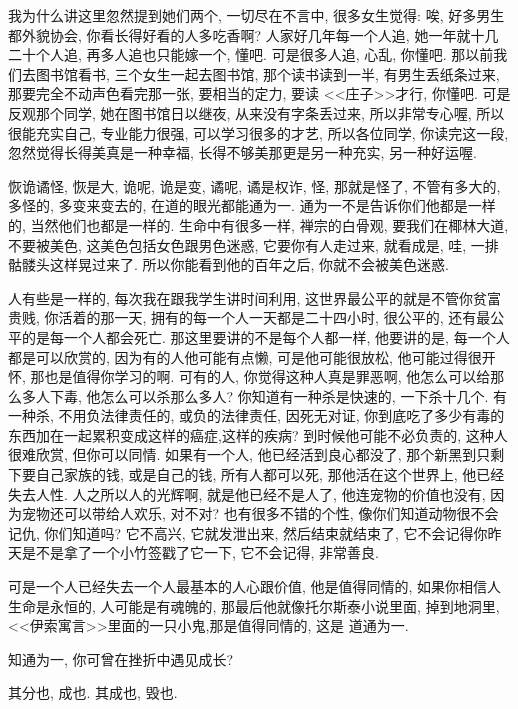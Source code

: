 \documentclass[11pt]{article}
\begin{document}
我为什么讲这里忽然提到她们两个, 一切尽在不言中, 很多女生觉得: 唉, 好多男生都外貌协会, 你看长得好看的人多吃香啊? 人家好几年每一个人追, 她一年就十几二十个人追, 再多人追也只能嫁一个, 懂吧. 可是很多人追, 心乱, 你懂吧. 那以前我们去图书馆看书, 三个女生一起去图书馆, 那个读书读到一半, 有男生丢纸条过来, 那要完全不动声色看完那一张, 要相当的定力, 要读 <<庄子>>才行, 你懂吧. 可是反观那个同学, 她在图书馆日以继夜, 从来没有字条丢过来, 所以非常专心喔, 所以很能充实自己, 专业能力很强, 可以学习很多的才艺, 所以各位同学, 你读完这一段, 忽然觉得长得美真是一种幸福, 长得不够美那更是另一种充实, 另一种好运喔. 

{\color{blue} 恢诡谲怪,} 恢是大, 诡呢, 诡是变, 谲呢, 谲是权诈, 怪, 那就是怪了, 不管有多大的, 多怪的, 多变来变去的, 在道的眼光都能通为一. 通为一不是告诉你们他都是一样的, 当然他们也都是一样的. 生命中有很多一样, 禅宗的白骨观, 要我们在椰林大道, 不要被美色, 这美色包括女色跟男色迷惑, 它要你有人走过来, 就看成是, 哇, 一排骷髅头这样晃过来了. 所以你能看到他的百年之后, 你就不会被美色迷惑. 

人有些是一样的, 每次我在跟我学生讲时间利用, 这世界最公平的就是不管你贫富贵贱, 你活着的那一天, 拥有的每一个人一天都是二十四小时, 很公平的, 还有最公平的是每一个人都会死亡. 那这里要讲的不是每个人都一样, 他要讲的是, 每一个人都是可以欣赏的, 因为有的人他可能有点懒, 可是他可能很放松, 他可能过得很开怀, 那也是值得你学习的啊. 可有的人, 你觉得这种人真是罪恶啊, 他怎么可以给那么多人下毒, 他怎么可以杀那么多人? 你知道有一种杀是快速的, 一下杀十几个. 有一种杀, 不用负法律责任的, 或负的法律责任, 因死无对证, 你到底吃了多少有毒的东西加在一起累积变成这样的癌症,这样的疾病? 到时候他可能不必负责的, 这种人很难欣赏, 但你可以同情. 如果有一个人, 他已经活到良心都没了, 那个新黑到只剩下要自己家族的钱, 或是自己的钱, 所有人都可以死, 那他活在这个世界上, 他已经失去人性. 人之所以人的光辉啊, 就是他已经不是人了, 他连宠物的价值也没有, 因为宠物还可以带给人欢乐, 对不对? 也有很多不错的个性, 像你们知道动物很不会记仇, 你们知道吗? 它不高兴, 它就发泄出来, 然后结束就结束了, 它不会记得你昨天是不是拿了一个小竹签戳了它一下, 它不会记得, 非常善良. 

可是一个人已经失去一个人最基本的人心跟价值, 他是值得同情的, 如果你相信人生命是永恒的, 人可能是有魂魄的, 那最后他就像托尔斯泰小说里面, 掉到地洞里, <<伊索寓言>>里面的一只小鬼,那是值得同情的, 这是{\color{blue} 道通为一}. 


{\Large {\color{purple} 知通为一, 你可曾在挫折中遇见成长?}}

\begin{center}
	\color{green} 其分也, 成也. 其成也, 毁也.
\end{center}
\end{document}
